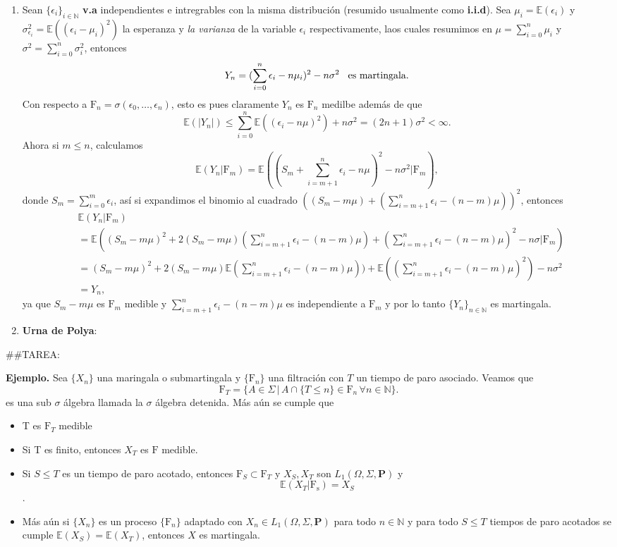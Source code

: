 \documentclass[letterpaper]{article}
\newcommand{\nat}{\ensuremath{ \mathbb N }}
\newcommand{\prob}{\textbf{P}}
\newcommand{\esp}{\mathbb E}
\newcommand{\eje}{{\newline \noindent \sc \textbf{Ejemplo. }}}
\newcommand{\om}{\ensuremath{\Omega}}
\newcommand{\sig}{\ensuremath{\Sigma}}
\begin{document}
\begin{enumerate}
\item Sean \(\{\epsilon_i\}_{i\in\nat}\) \textbf{v.a} independientes e intregrables con la misma distribución (resumido usualmente como \textbf{i.i.d}). Sea \(\mu_i=\esp(\epsilon_i)\) y \(\sigma_{\epsilon_i}^2=\esp((\epsilon_i-\mu_i)^2)\) la esperanza y \emph{la varianza} de la variable \(\epsilon_i\) respectivamente, laos cuales resumimos en  \(\mu=\sum_{i=0}^n\mu_i\) y \(\sigma^2=\sum_{i=0}^n\sigma_i^2\), entonces
\[
        Y_n=(\sum_{i=0}^n\epsilon_i-n\mu_i)^2-n\sigma^2\hspace{0.3cm}\text{es martingala}.
   \]
\noindent Con respecto a \(\mathrm{F}_n=\sigma(\epsilon_0,\dots,\epsilon_n)\), esto es pues claramente \(Y_n\) es \(\mathrm{F}_n\) medilbe además de que
\[
        \esp(|Y_n|)\leq\sum_{i=0}^n\esp((\epsilon_i-n\mu)^2)+n\sigma^2=(2n+1)\sigma^2<\infty.
   \]
\noindent Ahora si \(m\leq n\), calculamos
\[
        \esp(Y_n|\mathrm{F}_m)=\esp((S_m+\sum_{i=m+1}^n\epsilon_i-n\mu)^2-n\sigma^2|\mathrm{F}_m),
   \]
\noindent donde \(S_m=\sum_{i=0}^m\epsilon_i\), así si expandimos el binomio al cuadrado \(((S_m-m\mu)+(\sum_{i=m+1}^n\epsilon_i-(n-m)\mu))^2\), entonces
\begin{align*}
     &\esp(Y_n|\mathrm{F}_m)\\
     &=\esp((S_m-m\mu)^2+2(S_m-m\mu)(\sum_{i=m+1}^n\epsilon_i-(n-m)\mu)+(\sum_{i=m+1}^n\epsilon_i-(n-m)\mu)^2-n\sigma|\mathrm{F}_m)\\
     &=(S_m-m\mu)^2+2(S_m-m\mu)\esp(\sum_{i=m+1}^n\epsilon_i-(n-m)\mu))+\esp((\sum_{i=m+1}^n\epsilon_i-(n-m)\mu)^2)-n\sigma^2\\
     &= Y_n,
\end{align*}
\noindent ya que \(S_m-m\mu\) es \(\mathrm{F}_m\) medible y \(\sum_{i=m+1}^n\epsilon_i-(n-m)\mu\) es independiente a \(\mathrm{F}_m\) y por lo tanto \(\{Y_n\}_{n\in\nat}\) es martingala.
\item \textbf{Urna de Polya}:
\end{enumerate}

\#\#TAREA:

\eje Sea \(\{X_n\}\) una maringala o submartingala y \(\{\mathrm{F}_n\}\) una filtración con \(T\) un tiempo de paro asociado. Veamos que
\[
    \mathrm{F}_T=\{A\in\sig\,\vert\,A\cap\{T\leq n\}\in\mathrm{F}_n\,\forall n\in\nat\}.
\]
\noindent es una sub \(\sigma\) álgebra llamada la \(\sigma\) álgebra detenida. Más aún se cumple que
\begin{itemize}
\item T es \(\mathrm{F}_T\) medible
\item Si T es finito, entonces \(X_T\) es \(\mathrm{F}\) medible.
\item Si \(S\leq T\) es un tiempo de paro acotado, entonces \(\mathrm{F}_S\subset\mathrm{F}_T\) y \(X_S,X_T\) son \(L_1(\om,\sig,\prob)\) y \[\esp(X_T|\mathrm{F_s})=X_S\].
\item Más aún si \(\{X_n\}\) es un proceso \(\{\mathrm{F}_n\}\) adaptado con \(X_n\in L_1(\om,\sig,\prob)\) para todo \(n\in\nat\) y para todo \(S\leq T\) tiempos de paro acotados se cumple \(\esp(X_S)=\esp(X_T)\), entonces \(X\) es martingala.
\end{itemize}
\end{document}
